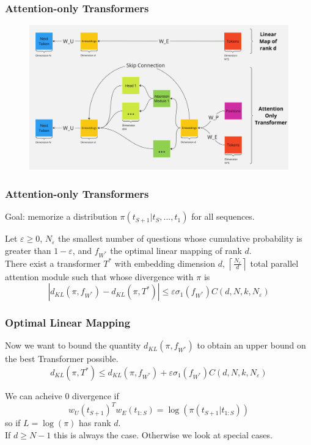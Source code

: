 \documentclass{beamer}
\begin{document}
\begin{frame}
    \frametitle{Attention-only Transformers}
    \begin{figure}
        \includegraphics[width=\textwidth]{Transformer view 3.jpg}
    \end{figure}
\end{frame}

\begin{frame}
    \frametitle{Attention-only Transformers}
    Goal: memorize a distribution $\pi(t_{S+1}|t_S,...,t_1)$ for all sequences.
    \break

    \begin{theorem}
        Let $\varepsilon \geq 0$, $N_{\varepsilon}$ the smallest number of questions whose cumulative probability is greater than $1-\varepsilon$, 
        and $f_{W^*}$ the optimal linear mapping of rank $d$. \\
        There exist a transformer $T^*$ with embedding dimension $d$, $\left\lceil\frac{N_{\varepsilon}}{d}\right\rceil$ total parallel attention module 
        such that whose divergence with $\pi$ is
        \[\left|d_{KL}(\pi, f_{W^*}) - d_{KL}(\pi, T^*)\right| \leq \varepsilon\sigma_1(f_{W^*})C(d, N, k, N_{\varepsilon})\]
    \end{theorem}
\end{frame}

\begin{frame}
    \frametitle{Optimal Linear Mapping}
    Now we want to bound the quantity $d_{KL}(\pi, f_{W^*})$ to obtain an upper bound on the best Transformer possible.
    \[d_{KL}(\pi, T^*) \leq d_{KL}(\pi, f_{W^*})+\varepsilon\sigma_1(f_{W^*})C(d, N, k, N_{\varepsilon})\]

    \break

    We can acheive $0$ divergence if \[w_U(t_{S+1})^Tw_E(t_{1:S}) = \log(\pi(t_{S+1}|t_{1:S}))\] so if $L=\log(\pi)$ has rank $d$.\\
    \pause
    If $d\geq N-1$ this is always the case. Otherwise we look at special cases.
    \end{frame}
\end{document}
